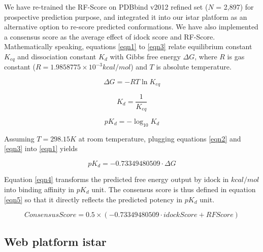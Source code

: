 We have re-trained the RF-Score on PDBbind v2012 refined set ($N$ = 2,897) for prospective prediction purpose, and integrated it into our istar platform as an alternative option to re-score predicted conformations. We have also implemented a consensus score as the average effect of idock score and RF-Score. Mathematically speaking, equations \eqref{eqn1} to \eqref{eqn3} relate equilibrium constant $K_{eq}$ and dissociation constant $K_d$ with Gibbs free energy $\Delta G$, where $R$ is gas constant ($R = 1.9858775 \times 10^{-3} kcal/mol$) and $T$ is absolute temperature.

\begin{equation}
\label{eqn1}
\Delta G = -RT\ln K_{eq}
\end{equation}

\begin{equation}
\label{eqn2}
K_d = \frac{1}{K_{eq}}
\end{equation}

\begin{equation}
\label{eqn3}
pK_d = -\log_{10} K_d
\end{equation}

Assuming $T = 298.15K$ at room temperature, plugging equations \eqref{eqn2} and \eqref{eqn3} into \eqref{eqn1} yields

\begin{equation}
\label{eqn4}
pK_d = -0.73349480509 \cdot \Delta G
\end{equation}

Equation \eqref{eqn4} transforms the predicted free energy output by idock in $kcal/mol$ into binding affinity in $pK_d$ unit. The consensus score is thus defined in equation \eqref{eqn5} so that it directly reflects the predicted potency in $pK_d$ unit.

\begin{equation}
\label{eqn5}
ConsensusScore = 0.5 \times (-0.73349480509 \cdot idockScore + RFScore)
\end{equation}

\subsection{Web platform istar}

